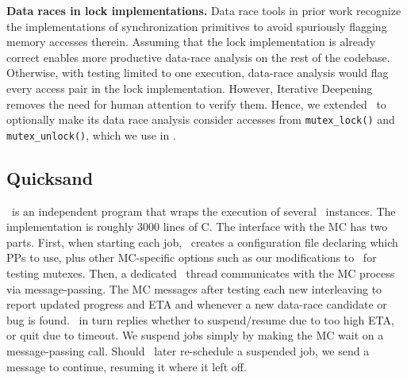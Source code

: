 {\bf Data races in lock implementations.}
Data race tools in prior work \cite{tsan,portend} recognize the implementations of synchronization primitives to avoid spuriously flagging memory accesses therein. %
Assuming that the lock implementation is already correct enables more productive data-race analysis on the rest of the codebase.
Otherwise, with testing limited to one execution,
data-race analysis would flag every access pair in the lock implementation. %
However, Iterative Deepening removes the need for human attention to verify them. %
Hence, we extended \landslide~to
optionally make its data race analysis consider accesses from {\tt mutex\_lock()} and {\tt mutex\_unlock()},
which we use in \sect{\ref{sec:testsuite}}.

\subsection{Quicksand}

\quicksand~is an independent program that wraps the execution of several \landslide~instances.
The implementation is roughly 3000 lines of C.
The interface with the MC has two parts. %
First, when starting each job, \quicksand~creates a configuration file declaring which PPs to use,
plus other MC-specific options such as our modifications to \landslide~for testing mutexes. %
Then, a dedicated \quicksand~thread communicates with the MC process via message-passing. %
The MC messages after testing each new interleaving to report updated progress and ETA
and whenever a new data-race candidate or bug is found.
\quicksand~in turn replies whether to suspend/resume due to too high ETA, or quit due to timeout.
We suspend jobs simply by making the MC wait on a message-passing call.
Should \quicksand~later re-schedule a suspended job, we send a message to continue,
resuming it where it left off.

